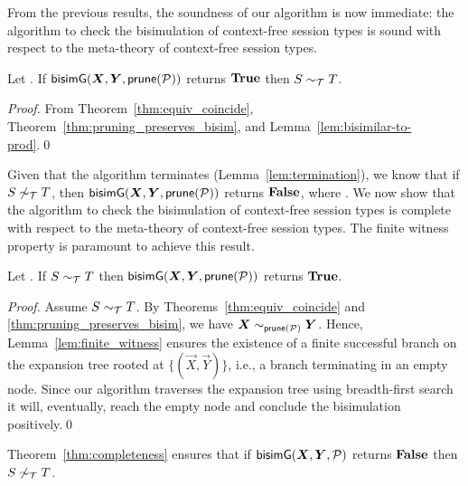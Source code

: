 From the previous results, the soundness of our algorithm is now
immediate: the algorithm to check the bisimulation of context-free
session types is sound with respect to
the meta-theory of context-free session types.

\begin{theorem}[Soundness]
  \label{thm:soundness}
  Let \grmcontext.  If $\Bisim(\vec X,\vec Y, \Prune(\productions))$ returns $\mathbf{True}$ then
  $S\sim_\mathcal T T$.
\end{theorem}
%
\begin{proof}
  From Theorem~\ref{thm:equiv_coincide}, Theorem~\ref{thm:pruning_preserves_bisim}, 
  and Lemma~\ref{lem:bisimilar-to-prod}.\qed
\end{proof}

 
Given that the algorithm terminates (Lemma~\ref{lem:termination}), we
know that if $S\not\sim_\mathcal T T$, then $\Bisim(\vec X, \vec Y, 
\Prune(\productions))$ returns $\mathbf{False}$, where \grmcontext.
%
We now show that the algorithm to check the bisimulation of
context-free session types is complete with respect to the meta-theory
of context-free session types. The finite witness property is
paramount to achieve this result.

\begin{sloppypar}
  \begin{theorem}[Completeness]
    \label{thm:completeness}
    Let \grmcontext.  If $S \sim_\mathcal T T$ then
    $\Bisim(\vec X, \vec Y, \Prune(\productions))$ returns $\mathbf{True}$.
  \end{theorem}
\end{sloppypar}
%
\begin{proof}
  Assume $S \sim_\mathcal T T$. By Theorems~\ref{thm:equiv_coincide}
  and \ref{thm:pruning_preserves_bisim},
  we have $\vec X \sim_{\Prune(\productions)} \vec Y$.  Hence,
  Lemma~\ref{lem:finite_witness} ensures the existence of a finite
  successful branch on the expansion tree rooted at
  $\{(\vec X,\vec Y)\}$, i.e., a branch terminating in an empty
  node.  Since our algorithm traverses the expansion tree using
  breadth-first search it will, eventually, reach the empty node and
  conclude the bisimulation positively.\qed
\end{proof}

Theorem~\ref{thm:completeness} ensures that if
$\Bisim(\vec X,\vec Y, \productions)$ returns $\mathbf{False}$ then
$S \not\sim_\mathcal T T$.


